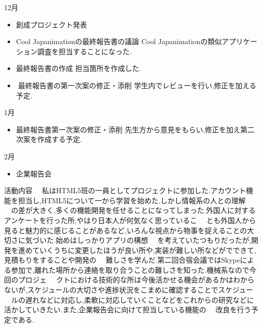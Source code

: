 12月
\begin{itemize}
\item 創成プロジェクト発表
\item Cool Japanimationの最終報告書の議論
Cool Japanimationの類似アプリケーション調査を担当することになった.
\item 最終報告書の作成
担当箇所を作成した.
\item最終報告書の第一次案の修正・添削
学生内でレビューを行い,修正を加える予定.
\end{itemize}
1月
\begin{itemize}
\item 最終報告書第一次案の修正・添削
先生方から意見をもらい,修正を加え第二次案を作成する予定.
\end{itemize}
2月
\begin{itemize}
\item 企業報告会
\end{itemize}
\par
活動内容
　私はHTML5班の一員としてプロジェクトに参加した.アカウント機能を担当し,HTML5について一から学習を始めた.しかし情報系の人との理解
　の差が大きく,多くの機能開発を任せることになってしまった.外国人に対するアンケートを行った所,やはり日本人が何気なく思っているこ
　とも外国人から見ると魅力的に感じることがあるなど,いろんな視点から物事を捉えることの大切さに気づいた.始めはしっかりアプリの構想
　を考えていたつもりだったが,開発を進めていくうちに変更したほうが良い所や,実装が難しい所などがでできて,見積もりをすることや開発の
　難しさを学んだ.第二回合宿会議ではSkypeによる参加で,離れた場所から連絡を取り合うことの難しさを知った.機械系なので今回のプロジェ
　クトにおける技術的な所は今後活かせる機会があるかはわからないが,スケジュールの大切さや進捗状況をこまめに確認することでスケジュー
　ルの遅れなどに対応し,柔軟に対応していくことなどをこれからの研究などに活かしていきたい.また,企業報告会に向けて担当している機能の
　改良を行う予定である.
　
